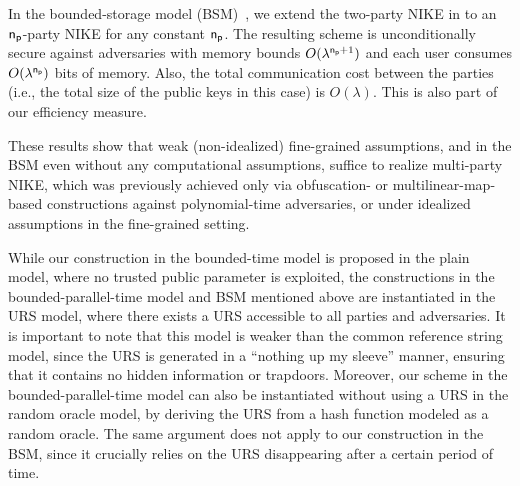 \begin{compactitem}
\item In the bounded-storage model (BSM)~\cite{C:CacMau97}, we extend the two-party NIKE in \cite{C:CacMau97} to an $\mathsf{n_p}$-party NIKE for any constant $\mathsf{n_p}$. The resulting scheme is unconditionally secure against  adversaries with memory bounds $O(\lambda^{\mathsf{n_p}+1})$ and each user consumes $O(\lambda^{\mathsf{n_p}})$ bits of memory.
Also, the total communication cost between the parties (i.e., the total size of the public keys in this case) is $O(\lambda)$. This is also part of our efficiency measure. %
\end{compactitem}

These results show that weak (non-idealized) fine-grained assumptions, and in the BSM even without any computational assumptions, suffice to realize multi-party NIKE, which was previously achieved only via obfuscation- or multilinear-map-based constructions against polynomial-time adversaries, or under idealized assumptions in the fine-grained setting.

While our construction in the bounded-time model is proposed in the plain model, where no trusted public parameter is exploited, the constructions in the bounded-parallel-time model and BSM mentioned above are instantiated in the URS model, where there exists a URS accessible to all parties and adversaries. It is important to note that this model is weaker than the common reference string model, since the URS is generated in a ``nothing up my sleeve'' manner, ensuring that it contains no hidden information or trapdoors. Moreover, our scheme in the bounded-parallel-time model can also be instantiated without using a URS in the random oracle model, by deriving the URS from a hash function modeled as a random oracle. The same argument does not apply to our construction in the BSM, since it crucially relies on the URS disappearing after a certain period of time.

